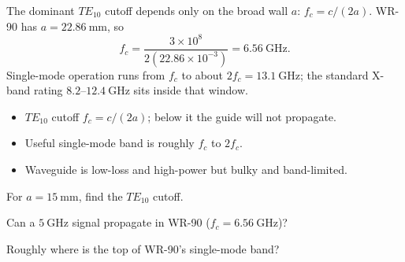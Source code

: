 \begin{workedexample}
The dominant $TE_{10}$ cutoff depends only on the broad wall $a$:
$f_c = c/(2a)$. WR-90 has $a = 22.86\ \text{mm}$, so
\[ f_c = \frac{3\times10^{8}}{2(22.86\times10^{-3})} = 6.56\ \text{GHz}. \]
Single-mode operation runs from $f_c$ to about $2f_c = 13.1\ \text{GHz}$; the
standard X-band rating $8.2$--$12.4\ \text{GHz}$ sits inside that window.
\end{workedexample}

\begin{keytakeaways}
\begin{itemize}[leftmargin=1.4em,itemsep=2pt]
\item $TE_{10}$ cutoff $f_c = c/(2a)$; below it the guide will not propagate.
\item Useful single-mode band is roughly $f_c$ to $2f_c$.
\item Waveguide is low-loss and high-power but bulky and band-limited.
\end{itemize}
\end{keytakeaways}

\begin{exercises}
\item For $a = 15\ \text{mm}$, find the $TE_{10}$ cutoff.
\item Can a $5\ \text{GHz}$ signal propagate in WR-90 ($f_c = 6.56\ \text{GHz}$)?
\item Roughly where is the top of WR-90's single-mode band?
\end{exercises}

